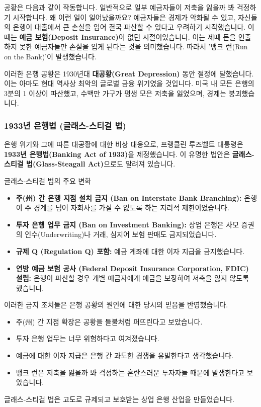 \documentclass[11pt,a4paper]{article}
\begin{document}
공황은 다음과 같이 작동합니다. 일반적으로 일부 예금자들이 저축을 잃을까 봐 걱정하기 시작합니다. 왜 이런 일이 일어났을까요? 예금자들은 경제가 악화될 수 있고, 자신들의 은행이 대출에서 큰 손실을 입어 결국 파산할 수 있다고 우려하기 시작했습니다. 이때는 \textbf{예금 보험(Deposit Insurance)}이 없던 시절이었습니다. 이는 제때 돈을 인출하지 못한 예금자들만 손실을 입게 된다는 것을 의미했습니다. 따라서 '뱅크 런(Run on the Bank)'이 발생했습니다.

이러한 은행 공황은 1930년대 \textbf{대공황(Great Depression)} 동안 절정에 달했습니다. 이는 아마도 현대 역사상 최악의 글로벌 금융 위기였을 것입니다. 미국 내 모든 은행의 3분의 1 이상이 파산했고, 수백만 가구가 평생 모은 저축을 잃었으며, 경제는 붕괴했습니다.

\subsubsection*{1933년 은행법 (글래스-스티걸 법)}
은행 위기와 그에 따른 대공황에 대한 비상 대응으로, 프랭클린 루즈벨트 대통령은 \textbf{1933년 은행법(Banking Act of 1933)}을 제정했습니다. 이 유명한 법안은 \textbf{글래스-스티걸 법(Glass-Steagall Act)}으로도 알려져 있습니다.

\begin{summarybox}{글래스-스티걸 법의 주요 변화}
\begin{itemize}
    \item \textbf{주(州) 간 은행 지점 설치 금지 (Ban on Interstate Bank Branching):} 은행이 주 경계를 넘어 자회사를 가질 수 없도록 하는 지리적 제한이었습니다.
    \item \textbf{투자 은행 업무 금지 (Ban on Investment Banking):} 상업 은행은 사모 증권의 인수(Underwriting)나 거래, 심지어 보험 판매도 금지되었습니다.
    \item \textbf{규제 Q (Regulation Q) 포함:} 예금 계좌에 대한 이자 지급을 금지했습니다.
    \item \textbf{연방 예금 보험 공사 (Federal Deposit Insurance Corporation, FDIC) 설립:} 은행이 파산할 경우 개별 예금자에게 예금을 보장하여 저축을 잃지 않도록 했습니다.
\end{itemize}
\end{summarybox}

이러한 금지 조치들은 은행 공황의 원인에 대한 당시의 믿음을 반영했습니다.
\begin{itemize}
    \item 주(州) 간 지점 확장은 공황을 들불처럼 퍼뜨린다고 보았습니다.
    \item 투자 은행 업무는 너무 위험하다고 여겨졌습니다.
    \item 예금에 대한 이자 지급은 은행 간 과도한 경쟁을 유발한다고 생각했습니다.
    \item 뱅크 런은 저축을 잃을까 봐 걱정하는 혼란스러운 투자자들 때문에 발생한다고 보았습니다.
\end{itemize}
글래스-스티걸 법은 고도로 규제되고 보호받는 상업 은행 산업을 만들었습니다.
\end{document}
